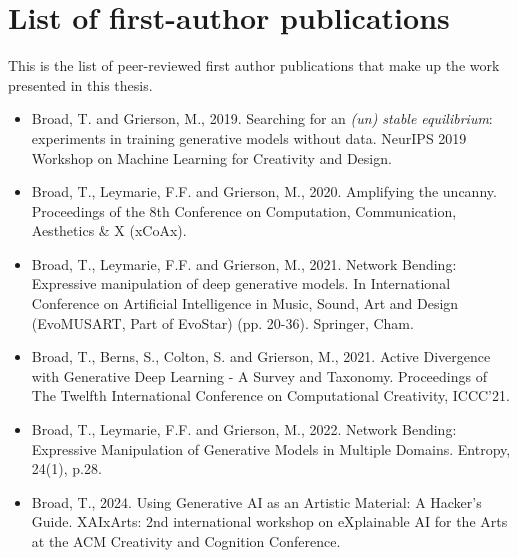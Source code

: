 \chapter*{List of first-author publications}

This is the list of peer-reviewed first author publications that make up the work presented in this thesis. 
\begin{itemize}
\item Broad, T. and Grierson, M., 2019. Searching for an \textit{(un) stable equilibrium}: experiments in training generative models without data. NeurIPS 2019 Workshop on Machine Learning for Creativity and Design. 
\item Broad, T., Leymarie, F.F. and Grierson, M., 2020. Amplifying the uncanny. Proceedings of the 8th Conference on Computation, Communication, Aesthetics \& X (xCoAx).
\item Broad, T., Leymarie, F.F. and Grierson, M., 2021. Network Bending: Expressive manipulation of deep generative models. In International Conference on Artificial Intelligence in Music, Sound, Art and Design (EvoMUSART, Part of EvoStar) (pp. 20-36). Springer, Cham.
\item Broad, T., Berns, S., Colton, S. and Grierson, M., 2021. Active Divergence with Generative Deep Learning - A Survey and Taxonomy. Proceedings of The Twelfth International Conference on Computational Creativity, ICCC’21. 
\item Broad, T., Leymarie, F.F. and Grierson, M., 2022. Network Bending: Expressive Manipulation of Generative Models in Multiple Domains. Entropy, 24(1), p.28.
\item Broad, T., 2024. Using Generative AI as an Artistic Material: A Hacker's Guide. XAIxArts: 2nd international workshop on eXplainable AI for the Arts at the ACM Creativity and Cognition Conference.
\end{itemize}